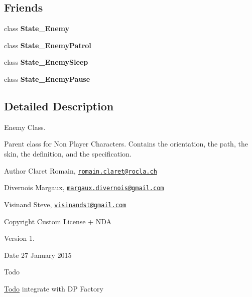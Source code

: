 \subsection*{Friends}
\begin{DoxyCompactItemize}
\item 
\hypertarget{class_c___enemy_ac2bc28e13010eb6fac4ddcb5538b3365}{}class {\bfseries State\+\_\+\+Enemy}\label{class_c___enemy_ac2bc28e13010eb6fac4ddcb5538b3365}

\item 
\hypertarget{class_c___enemy_a3785918212b653162334df139aee07f1}{}class {\bfseries State\+\_\+\+Enemy\+Patrol}\label{class_c___enemy_a3785918212b653162334df139aee07f1}

\item 
\hypertarget{class_c___enemy_a8a4a0e950f3f2f59a682703182fef615}{}class {\bfseries State\+\_\+\+Enemy\+Sleep}\label{class_c___enemy_a8a4a0e950f3f2f59a682703182fef615}

\item 
\hypertarget{class_c___enemy_a6b51451cac24c61ec310075877e6bd72}{}class {\bfseries State\+\_\+\+Enemy\+Pause}\label{class_c___enemy_a6b51451cac24c61ec310075877e6bd72}

\end{DoxyCompactItemize}


\subsection{Detailed Description}
Enemy Class. 

Parent class for Non Player Characters. Contains the orientation, the path, the skin, the definition, and the specification. \begin{DoxyAuthor}{Author}
Claret Romain, \href{mailto:romain.claret@rocla.ch}{\tt romain.\+claret@rocla.\+ch} 

Divernois Margaux, \href{mailto:margaux.divernois@gmail.com}{\tt margaux.\+divernois@gmail.\+com} 

Visinand Steve, \href{mailto:visinandst@gmail.com}{\tt visinandst@gmail.\+com} 
\end{DoxyAuthor}
\begin{DoxyCopyright}{Copyright}
Custom License + N\+D\+A 
\end{DoxyCopyright}
\begin{DoxyVersion}{Version}
1. 
\end{DoxyVersion}
\begin{DoxyDate}{Date}
27 January 2015 
\end{DoxyDate}
\begin{DoxyRefDesc}{Todo}
\item[\hyperlink{todo__todo000004}{Todo}]integrate with D\+P Factory \end{DoxyRefDesc}


